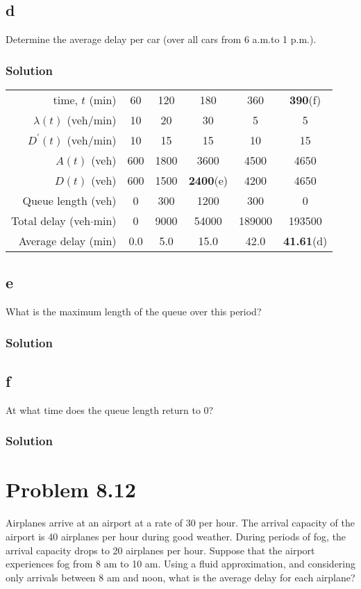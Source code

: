 \documentclass[letterpaper]{amsart}
\begin{document}
\subsection*{d}
Determine the average delay per car (over all cars from 6 a.m.to 1 p.m.).
\subsubsection*{Solution}
\begin{center}
\begin{tabular}{rccccc}
  time, $t$ (min) & 60 & 120 & 180 & 360 & \textbf{390}(f)\\
  $\lambda(t)$ (veh/min)&10& 20& 30& 5& 5\\
  $D^\prime(t)$ (veh/min)&10& 15& 15& 10& 15 \\
  $A(t)$ (veh) &600& 1800 & 3600 & 4500& 4650 \\
  $D(t)$ (veh) &600& 1500 & \textbf{2400}(e)& 4200& 4650 \\
  Queue length (veh) &0&  300& 1200& 300&    0 \\
  Total delay (veh$\cdot$min)& 0 & 9000 & 54000 & 189000 & 193500\\
  Average delay (min) & 0.0 & 5.0 & 15.0 & 42.0 & \textbf{41.61}(d)
\end{tabular}
\end{center}
\subsection*{e}
What is the maximum length of the queue over this period?
\subsubsection*{Solution}
\subsection*{f}
At what time does the queue length return to 0?
\subsubsection*{Solution}

\section{Problem 8.12} %
Airplanes arrive at an airport at a rate of 30 per hour. The arrival capacity
of the airport is 40 airplanes per hour during good weather. During periods
of fog, the arrival capacity drops to 20 airplanes per hour. Suppose that the
airport experiences fog from 8 am to 10 am. Using a fluid approximation,
and considering only arrivals between 8 am and noon, what is the average
delay for each airplane?
\end{document}
